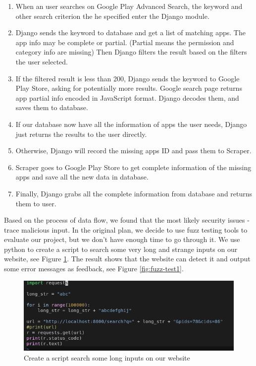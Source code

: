 \documentclass[12pt, a4paper]{article}
\begin{document}
\begin{enumerate}
    \item When an user searches on Google Play Advanced Search, the keyword and other search criterion the he specified enter the Django module. 
    \item  Django sends the keyword to database and get a list of matching apps. The app info may be complete or partial. (Partial means the permission and category info are missing) Then Django filters the result based on the filters the user selected.
    \item If the filtered result is less than 200, Django sends the keyword to Google Play Store, asking for potentially more results. Google search page returns app partial info encoded in JavaScript format. Django decodes them, and saves them to database.
    \item If our database now have all the information of apps the user needs, Django just returns the results to the user directly. 
    \item Otherwise, Django will record the missing apps ID and pass them to Scraper.
    \item Scraper goes to Google Play Store to get complete information of the missing apps and save all the new data in database.
    \item Finally, Django grabs all the complete information from database and returns them to user.
\end{enumerate}

Based on the process of data flow, we found that the most likely security issues - trace malicious input. In the original plan, we decide to use fuzz testing tools to evaluate our project, but we don't have enough time to go through it. We use python to create a script to search some very long and strange inputs on our website, see Figure \ref{fig:fuzz-test2}. The result shows that the website can detect it and output some error messages as feedback, see Figure \ref{fig:fuzz-test1}. 

\begin{figure}[ht]
\centering
\includegraphics[width=\textwidth]{fuzz-test2.png}
\caption{Create a script search some long inputs on our website}
\label{fig:fuzz-test2}
\end{figure}
\end{document}
